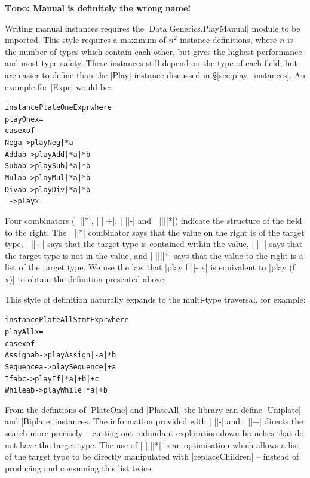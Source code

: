 \documentclass[preprint]{sigplanconf}
\newcommand{\todo}[1]{\textbf{\textsc{Todo:} #1}}
\newenvironment{code}{\begin{alltt}\small}{\end{alltt}}
\begin{document}
\todo{Manual is definitely the wrong name!}

Writing manual instances requires the |Data.Generics.PlayManual| module to be imported. This style requires a maximum of $n^2$ instance definitions, where $n$ is the number of types which contain each other, but gives the highest performance and most type-safety. These instances still depend on the type of each field, but are easier to define than the |Play| instance discussed in \S\ref{sec:play_instances}. An example for |Expr| would be:

\begin{code}
instance PlateOne Expr where
    playOne x =
        case x of
            Neg  a    -> play Neg  |* a
            Add  a b  -> play Add  |* a |* b
            Sub  a b  -> play Sub  |* a |* b
            Mul  a b  -> play Mul  |* a |* b
            Div  a b  -> play Div  |* a |* b
            _         -> play x
\end{code}

Four combinators (| ||*|, | ||+|, | ||-| and | ||||*|) indicate the structure of the field to the right. The | ||*| combinator says that the value on the right is of the target type, | ||+| says that the target type is contained within the value, | ||-| says that the target type is not in the value, and | ||||*| says that the value to the right is a list of the target type. We use the law that |play f ||- x| is equivalent to |play (f x)| to obtain the definition presented above.

This style of definition naturally expands to the multi-type traversal, for example:

\begin{code}
instance PlateAll Stmt Expr where
    playAll x =
        case x of
            Assign    a b    -> play Assign    |-  a |*  b
            Sequence  a      -> play Sequence  |+  a
            If        a b c  -> play If        |*  a |+  b |+ c
            While     a b    -> play While     |*  a |+  b
\end{code}

From the defintions of |PlateOne| and |PlateAll| the library can define |Uniplate| and |Biplate| instances. The information provided with | ||-| and | ||+| directs the search more precisely -- cutting out redundant exploration down branches that do not have the target type. The use of | ||||*| is an optimisation which allows a list of the target type to be directly manipulated with |replaceChildren| -- instead of producing and consuming this list twice.
\end{document}
